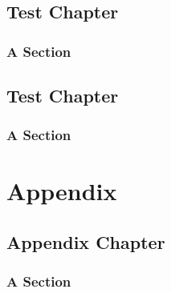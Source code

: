 \documentclass[10pt,paper=a4,footinclude=false,headinclude=false]{scrbook} %
\begin{document}
    
    
    \chapter{Test Chapter}
    \lipsum[1]

    \section{A Section}
    \lipsum[1]
    
    \chapter{Test Chapter}
    \lipsum[1]
    
    \section{A Section}
    \lipsum[1]

%	

    \appendix
    \cleardoublepage\part{Appendix}
    \chapter{Appendix Chapter}
    \lipsum[1]
    
    \section{A Section}
    \lipsum[1]
\end{document}
